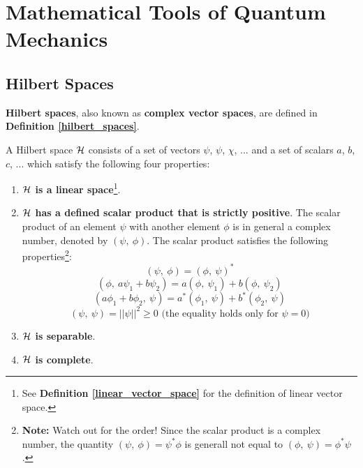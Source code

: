 \section{Mathematical Tools of Quantum Mechanics}

\subsection{Hilbert Spaces}

\textbf{Hilbert spaces}, also known as \textbf{complex vector spaces}, are defined in \textbf{Definition \ref{hilbert_spaces}}.

\begin{definition} \label{hilbert_spaces}
    A Hilbert space $\mathcal{H}$ consists of a set of vectors $\psi$, $\psi$, $\chi$, ... and a set of scalars $a$, $b$, $c$, ... which satisfy the following four properties:

    \begin{enumerate}
        \item \textbf{$\mathcal{H}$ is a linear space}\footnote{See \textbf{Definition \ref{linear_vector_space}} for the definition of linear vector space.}.
        \item \textbf{$\mathcal{H}$ has a defined scalar product that is strictly positive}. The scalar product of an element $\psi$ with another element $\phi$ is in general a complex number, denoted by $(\psi,\ \phi)$. The scalar product satisfies the following properties\footnote{\textbf{Note:} Watch out for the order! Since the scalar product is a complex number, the quantity $(\psi,\ \phi) = \psi^*\phi$ is generall not equal to $(\phi,\ \psi) = \phi^*\psi$.}:
        \begin{equation}
            (\psi,\ \phi) = (\phi,\ \psi)^*
        \end{equation}
        \begin{equation}
            (\phi,\ a\psi_1 + b\psi_2) = a(\phi,\ \psi_1) + b(\phi,\ \psi_2)
        \end{equation}
        \begin{equation}
            (a\phi_1 + b\phi_2,\ \psi) = a^*(\phi_1,\ \psi) + b^*(\phi_2,\ \psi)
        \end{equation}
        \begin{equation}
            (\psi,\ \psi) = ||\psi||^2 \geq 0 \text{ (the equality holds only for } \psi = 0\text{)}
        \end{equation}
        \item \textbf{$\mathcal{H}$ is separable}.
        \item \textbf{$\mathcal{H}$ is complete}.
    \end{enumerate}
\end{definition}

